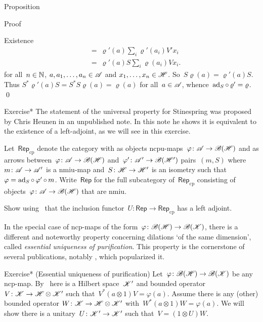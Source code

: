 \begin{parsec}
\begin{point}{Proposition}
\begin{point}{Proof}
\begin{point}{Existence}
\begin{align*}
    &\  =\ \varrho'(a) \sum_i \varrho'(a_i)V'x_i\\
    &\ =\ \varrho'(a) S \sum_i \varrho(a_i)V x_i.
\end{align*}
for all~$n \in \mathbb{N}$, $a, a_1, \ldots, a_n \in \mathscr{A}$ and
    $x_1, \ldots, x_n \in \mathscr{H}$.
So~$S \varrho(a) = \varrho'(a)S$.
Thus $S^* \varrho'(a) S = S^*S\varrho(a) = \varrho(a)$ for all~$a\in \mathscr{A}$,
whence~$\mathrm{ad}_S \mathop{\circ} \varrho' = \varrho$. \qed
\end{point}
\end{point}
\end{point}
\begin{point}{Exercise*}%
    The statement of the universal property
        for Stinespring
        was proposed by Chris Heunen in an unpublished note.
    In this note he shows it is equivalent to the existence
        of a left-adjoint, as we will see in this exercise.
    
    Let~$\mathsf{Rep}_{\mathrm{cp}}$
        denote the category with as objects
            ncpu-maps~$\varphi\colon \mathscr{A} \to \mathscr{B}(\mathscr{H})$
            and as arrows between~$\varphi\colon \mathscr{A} \to \mathscr{B}(\mathscr{H})$
            and~$\varphi'\colon \mathscr{A}' \to \mathscr{B}(\mathscr{H}')$
            pairs~$(m, S)$
            where~$m\colon \mathscr{A} \to \mathscr{A}'$ is a nmiu-map
            and~$S\colon \mathscr{H} \to \mathscr{H}'$ is an isometry
            such that~$\varphi = \mathrm{ad}_S \mathop{\circ} \varphi' \mathop{\circ} m$.
    Write~$\mathsf{Rep}$
        for the full subcategory of~$\mathsf{Rep}_{\mathrm{cp}}$
        consisting of objects~$\varphi\colon \mathscr{A} \to \mathscr{B}(\mathscr{H})$
            that are nmiu.

Show using~
    that the inclusion functor~$U \colon \mathsf{Rep}
    \to \mathsf{Rep}_{\mathrm{cp}}$ has a left adjoint.
\par %
\begin{point}%
In the special case of ncp-maps
    of the form~$\varphi \colon \mathscr{B}(\mathscr{H}) \to \mathscr{B}(\mathscr{K})$,
    there is a different and noteworthy  property
    concerning dilations `of the same dimension',
    called \emph{essential uniqueness of purification}.
This property is the cornerstone of several publications,
    notably \cite{chiribella}, which popularized it.
\par %
\end{point}
\end{point}
\begin{point}{Exercise* (Essential uniqueness of purification)}
    Let~$\varphi \colon \mathscr{B}(\mathscr{H}) \to \mathscr{B}(\mathscr{K})$
        be any ncp-map.
    By~
    here is a Hilbert space~$\mathscr{K}'$
        and bounded operator~$V\colon \mathscr{K} \to \mathscr{H} \otimes \mathscr{K}'$
        such that~$V^* (a\otimes 1) V = \varphi(a)$.
        Assume there is any (other) bounded operator
        $W\colon \mathscr{K} \to \mathscr{H} \otimes \mathscr{K}'$
        with~$W^* (a \otimes 1) W = \varphi(a)$.
    We will show there is a unitary~$U \colon \mathscr{K}' \to \mathscr{K}'$
    such that~$V = (1 \otimes U) W$.


\end{point}
\end{parsec}
